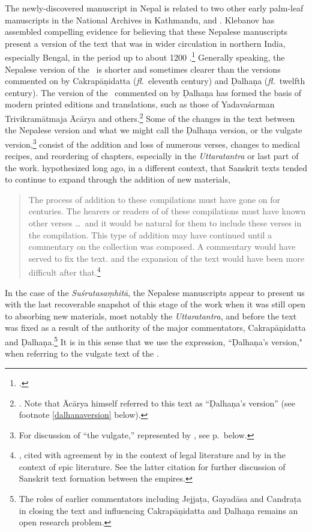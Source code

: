 The newly-discovered manuscript in Nepal is related to two other early
palm-leaf manuscripts in the National Archives in Kathmandu,  and . Klebanov has assembled
compelling evidence for believing that these Nepalese manuscripts present a
version of the text that was in wider circulation in northern India,
especially Bengal, in the period up to about 1200
\CE.\footcite{kleb-2010,kleb-2021b} Generally speaking, the Nepalese version
of the \SS\ is shorter and sometimes clearer than the versions commented on by
Cakrapāṇidatta (\emph{fl.}\ eleventh century) and Ḍalhaṇa (\emph{fl.}\ twelfth
century).  The version of the \SS\ commented on by Ḍalhaṇa has formed the
basis of modern printed editions and translations, such as those of
Yadavaśarman Trivikramātmaja Ācārya and
others.\footnote{\cite{susr-trikamji1,vulgate,shar-susr}. Note that Ācārya
    himself referred to this text as “Ḍalhaṇa's version” (see footnote
    \ref{dalhanaversion} below).} Some of the changes in the text between the
    Nepalese version and what we might call the Ḍalhaṇa version, or the vulgate
    version,\footnote{For discussion of “the vulgate,” represented by
        \cite{vulgate}, see p.\,\pageref{vulgate} below.} consist of the addition and
        loss of numerous verses, changes to medical recipes, and reordering of
        chapters, especially in the \emph{Uttaratantra} or last part of the work.
        \citeauthor{lari-2003} hypothesized long ago, in a different context, that
        Sanskrit texts tended to continue to expand through the addition of new
        materials,
\begin{quote}
The process of addition to these compilations must have gone on for centuries. The
hearers or readers of of these compilations must have known other verses \ldots\
and it would be natural for them to include these verses in the compilation. This
type of  addition may have continued until a commentary on the collection was
composed.   A commentary would have served to fix the text. and the expansion of
the text would have been more difficult after
that.\footnote{\cite[xii]{lari-2003}, cited with agreement by
    \citet[51]{oliv-manu} in the context of legal literature and by
    \citet[62--63]{bron-how} in the context of epic literature.  See the latter
    citation for further discussion of Sanskrit text formation between the empires. 
    }
\end{quote}
In the case of the \emph{Suśrutasaṃhitā}, the Nepalese manuscripts appear to present us 
with the last recoverable snapshot of this stage of the work when it was still open to 
absorbing new materials, most notably the \emph{Uttaratantra}, and before the text was 
fixed as a result of the authority of the major commentators, Cakrapāṇidatta and 
Ḍalhaṇa.\footnote{The roles of earlier commentators including Jejjaṭa, Gayadāsa and 
Candraṭa in closing the text and influencing Cakrapāṇidatta and Ḍalhaṇa remains an open 
research problem.}  It is in this sense that we use the expression, ``Ḍalhaṇa's version," when 
referring to the vulgate text of the \SS.

